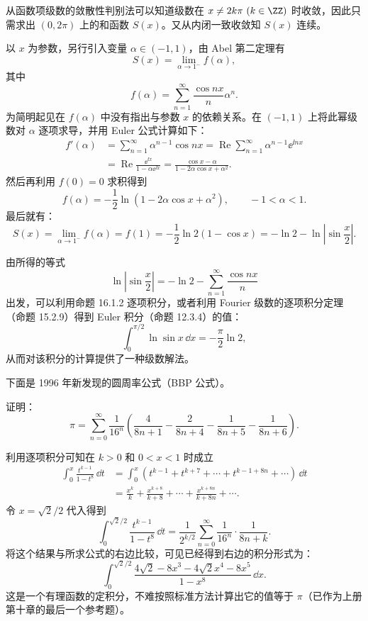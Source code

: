 \begin{xsolution}
从函数项级数的敛散性判别法可以知道级数在 $x\ne2k\pi\ (k\in\ZZ)$ 时收敛，因此只需求出 $(0,2\pi)$ 上的和函数 $S(x)$。又从内闭一致收敛知 $S(x)$ 连续。

以 $x$ 为参数，另行引入变量 $\alpha\in(-1,1)$，由 Abel 第二定理有
\[
  S(x)=\lim_{\alpha\to1^-}f(\alpha),
\]
其中
\[
  f(\alpha)=\sum_{n=1}^{\infty}\frac{\cos nx}{n}\alpha^n.
\]
为简明起见在 $f(\alpha)$ 中没有指出与参数 $x$ 的依赖关系。在 $(-1,1)$ 上将此幂级数对 $\alpha$ 逐项求导，并用 Euler 公式计算如下：
\[
\begin{aligned}
  f'(\alpha)
  &=\sum_{n=1}^{\infty}\alpha^{n-1}\cos nx
   =\operatorname{Re}\sum_{n=1}^{\infty}\alpha^{n-1}\ee^{\ii nx}\\
  &=\operatorname{Re}\frac{\ee^{\ii x}}{1-\alpha\ee^{\ii x}}
   =\frac{\cos x-\alpha}{1-2\alpha\cos x+\alpha^2}.
\end{aligned}
\]
然后再利用 $f(0)=0$ 求积得到
\[
  f(\alpha)=-\frac12\ln(1-2\alpha\cos x+\alpha^2),\qquad -1<\alpha<1.
\]
最后就有：
\[
  S(x)=\lim_{\alpha\to1^-}f(\alpha)=f(1)
  =-\frac12\ln 2(1-\cos x)
  =-\ln2-\ln\left|\sin\frac x2\right|.
\]
\end{xsolution}

\begin{xremark}
由所得的等式
\[
  \ln\left|\sin\frac x2\right|=-\ln2-\sum_{n=1}^{\infty}\frac{\cos nx}{n}
\]
出发，可以利用命题 16.1.2 逐项积分，或者利用 Fourier 级数的逐项积分定理（命题 15.2.9）得到 Euler 积分（命题 12.3.4）的值：
\[
  \int_0^{\pi/2}\ln\sin x\,\dd x=-\frac\pi2\ln2,
\]
从而对该积分的计算提供了一种级数解法。
\end{xremark}

下面是 1996 年新发现的圆周率公式（BBP 公式）。

\begin{xexample}[16.2.6]
证明：
\begin{equation}
  \pi=\sum_{n=0}^{\infty}\frac1{16^n}
  \left(\frac4{8n+1}-\frac2{8n+4}-\frac1{8n+5}-\frac1{8n+6}\right).
\tag{16.14}
\label{eq:16.14}
\end{equation}
\end{xexample}

\begin{xproof}
利用逐项积分可知在 $k>0$ 和 $0<x<1$ 时成立
\[
\begin{aligned}
  \int_0^x\frac{t^{k-1}}{1-t^8}\,\dd t
  &=\int_0^x(t^{k-1}+t^{k+7}+\cdots+t^{k-1+8n}+\cdots)\,\dd t\\
  &=\frac{x^k}{k}+\frac{x^{k+8}}{k+8}+\cdots+\frac{x^{k+8n}}{k+8n}+\cdots.
\end{aligned}
\]
令 $x=\sqrt2/2$ 代入得到
\[
  \int_0^{\sqrt2/2}\frac{t^{k-1}}{1-t^8}\,\dd t
  =\frac1{2^{k/2}}\sum_{n=0}^{\infty}\frac1{16^n}\cdot\frac1{8n+k}.
\]
将这个结果与所求公式的右边比较，可见已经得到右边的积分形式为：
\[
  \int_0^{\sqrt2/2}\frac{4\sqrt2-8x^3-4\sqrt2x^4-8x^5}{1-x^8}\,\dd x.
\]
这是一个有理函数的定积分，不难按照标准方法计算出它的值等于 $\pi$（已作为上册第十章的最后一个参考题）。
\end{xproof}

